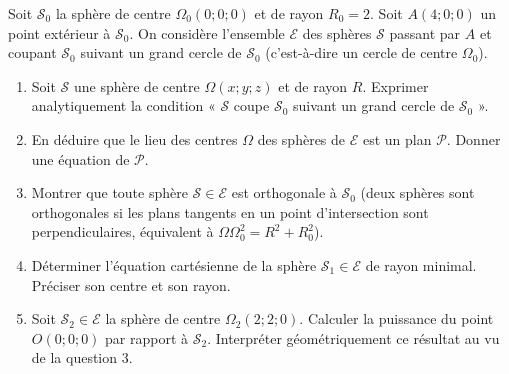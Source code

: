 \documentclass[11pt]{article}
\begin{document}
\begin{exercice}
Soit $\mathcal{S}_0$ la sphère de centre $\Omega_0(0;0;0)$ et de rayon $R_0 = 2$. Soit $A(4;0;0)$ un point extérieur à $\mathcal{S}_0$.
On considère l'ensemble $\mathcal{E}$ des sphères $\mathcal{S}$ passant par $A$ et coupant $\mathcal{S}_0$ suivant un grand cercle de $\mathcal{S}_0$ (c'est-à-dire un cercle de centre $\Omega_0$).
\begin{enumerate}
    \item Soit $\mathcal{S}$ une sphère de centre $\Omega(x;y;z)$ et de rayon $R$. Exprimer analytiquement la condition « $\mathcal{S}$ coupe $\mathcal{S}_0$ suivant un grand cercle de $\mathcal{S}_0$ ».
    \item En déduire que le lieu des centres $\Omega$ des sphères de $\mathcal{E}$ est un plan $\mathcal{P}$. Donner une équation de $\mathcal{P}$.
    \item Montrer que toute sphère $\mathcal{S} \in \mathcal{E}$ est orthogonale à $\mathcal{S}_0$ (deux sphères sont orthogonales si les plans tangents en un point d'intersection sont perpendiculaires, équivalent à $\Omega\Omega_0^2 = R^2 + R_0^2$).
    \item Déterminer l'équation cartésienne de la sphère $\mathcal{S}_1 \in \mathcal{E}$ de rayon minimal. Préciser son centre et son rayon.
    \item Soit $\mathcal{S}_2 \in \mathcal{E}$ la sphère de centre $\Omega_2(2;2;0)$. Calculer la puissance du point $O(0;0;0)$ par rapport à $\mathcal{S}_2$. Interpréter géométriquement ce résultat au vu de la question 3.
\end{enumerate}
\end{exercice}
\end{document}
